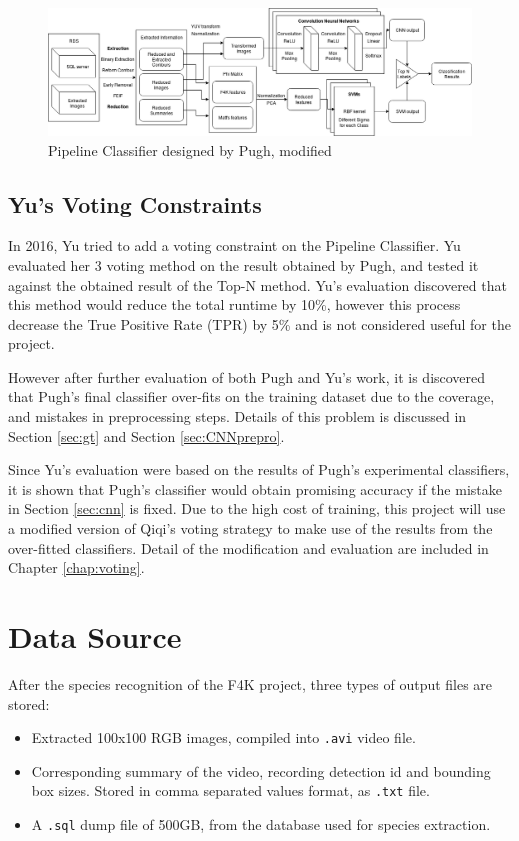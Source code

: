 \documentclass[bsc,logo,twoside,fullspacing,parskip]{infthesis}
\begin{document}
\begin{figure}[!h]
    \centering
    \includegraphics[scale=0.3]{graph/Pipeline_Classifier.png}
    \caption{Pipeline Classifier designed by Pugh, modified}
    \label{fig:pipeline}
\end{figure}

\section{Yu's Voting Constraints}

In 2016, Yu\cite{P3} tried to add a voting constraint on the Pipeline Classifier. 
Yu evaluated her 3 voting method on the result obtained by Pugh, and tested it against the obtained result of the Top-N method. 
Yu's evaluation discovered that this method would reduce the total runtime by 10\%, however this process decrease the True Positive Rate (TPR) by 5\% and is not considered useful for the project. 

However after further evaluation of both Pugh and Yu's work, it is discovered that Pugh's final classifier over-fits on the training dataset due to the coverage, and mistakes in preprocessing steps. Details of this problem is discussed in Section \ref{sec:gt} and Section \ref{sec:CNNprepro}. 

Since Yu's evaluation were based on the results of Pugh's experimental classifiers, it is shown that Pugh's classifier would obtain promising accuracy if the mistake in Section \ref{sec:cnn} is fixed. Due to the high cost of training, this project will use a modified version of Qiqi's voting strategy to make use of the results from the over-fitted classifiers. Detail of the modification and evaluation are included in Chapter \ref{chap:voting}.

\chapter{Data Source}
\label{chap:datasource}

After the species recognition of the F4K project, three types of output files are stored:
\begin{itemize}
\item
Extracted 100x100 RGB images, compiled into {\tt .avi} video file.
\item
Corresponding summary of the video, recording detection id and bounding box sizes. Stored in comma separated values format, as {\tt .txt} file.
\item
A {\tt .sql} dump file of 500GB, from the database used for species extraction.
\end{itemize}
\end{document}
